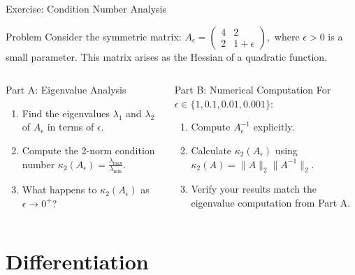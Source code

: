 \documentclass[aspectratio=1610]{beamer}
\begin{document}
\begin{frame}{Exercise: Condition Number Analysis}

\begin{block}{Problem}
Consider the symmetric matrix: $A_\epsilon = \begin{pmatrix} 4 & 2 \\ 2 & 1 + \epsilon \end{pmatrix},$
where $\epsilon > 0$ is a small parameter. This matrix arises as the Hessian of a quadratic function.
\end{block}

  \begin{columns}
    \begin{column}{0.5\textwidth}
\begin{block}{Part A: Eigenvalue Analysis}
\begin{enumerate}
\item Find the eigenvalues $\lambda_1$ and $\lambda_2$ of $A_\epsilon$ in terms of $\epsilon$.
\item Compute the 2-norm condition number $\kappa_2(A_\epsilon) = \frac{\lambda_{\max}}{\lambda_{\min}}$.
\item What happens to $\kappa_2(A_\epsilon)$ as $\epsilon \to 0^+$?
\end{enumerate}
\end{block}
    \end{column}
    \begin{column}{0.5\textwidth}

\begin{block}{Part B: Numerical Computation}
For $\epsilon \in \{1, 0.1, 0.01, 0.001\}$:
\begin{enumerate}
\item Compute $A_\epsilon^{-1}$ explicitly.
\item Calculate $\kappa_2(A_\epsilon)$ using $\kappa_2(A) = \|A\|_2 \|A^{-1}\|_2$.
\item Verify your results match the eigenvalue computation from Part A.
\end{enumerate}
\end{block}
\end{column}
  \end{columns}

\end{frame}

\section{Differentiation}
\end{document}

